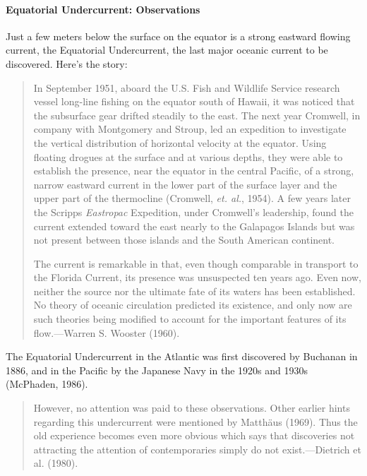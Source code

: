 \paragraph{Equatorial Undercurrent: Observations}
Just a few meters below the
surface on the equator is a strong eastward flowing current, the
Equatorial Undercurrent, the last major oceanic current to be
discovered. Here's the story:
\begin{quotation} \small
In September 1951, aboard the U.S. Fish and Wildlife Service research
vessel long-line fishing on the equator south of Hawaii, it was
noticed that the subsurface gear drifted steadily to the east. The
next year Cromwell, in company with Montgomery and Stroup, led an
expedition to investigate the vertical distribution of horizontal
velocity at the equator. Using floating drogues at the surface and at
various depths, they were able to establish the presence, near the
equator in the central Pacific, of a strong, narrow eastward current
in the lower part of the surface layer and the upper part of the
thermocline (Cromwell, \textit{et. al.},
1954). A few years later the Scripps \textit{Eastropac} Expedition,
under Cromwell's leadership, found the current extended toward the
east nearly to the Galapagos Islands but was not present between those
islands and the South American continent.

The current is remarkable in that, even though comparable in
transport to the Florida
Current, its presence was unsuspected ten years ago.  Even now,
neither the source nor the ultimate fate of its waters has been
established. No theory of oceanic circulation predicted its existence,
and only now are such theories being modified to account for the
important features of its flow.---Warren S.  Wooster (1960).
\end{quotation}

The Equatorial Undercurrent in the Atlantic was first discovered by
Buchanan in 1886, and in the Pacific by the Japanese Navy in the 1920s
and 1930s (McPhaden, 1986).
\begin{quote} \small
However, no attention was paid to these observations. Other earlier
hints regarding this undercurrent were mentioned by Matth\"{a}us
(1969). Thus the old experience becomes even more obvious which says
that discoveries not attracting the attention of contemporaries simply
do not exist.---Dietrich et al. (1980).
\end{quote}

